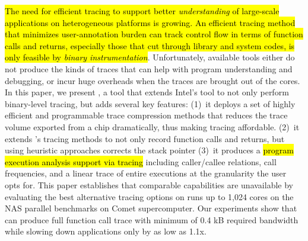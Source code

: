 \hl{The need for efficient tracing to 
support better \textit{understanding} of
large-scale applications on heterogeneous platforms is growing. 
%
An efficient tracing method that minimizes user-annotation burden
can track control flow in terms of function calls and returns, especially
those that cut through library and system codes, 
is only feasible by \textit{binary instrumentation}}.
%
Unfortunately, available tools either do not produce the kinds
of traces that can help with program understanding and debugging,
or incur huge overheads when
the traces are brought out of the cores.
%
In this paper, we present \parlot,  a tool that extends Intel's \pin
tool to not only perform binary-level tracing, but adds several key
features: (1)~it deploys a set of highly efficient and programmable
trace compression methods that reduces the trace volume exported 
from a chip dramatically, thus making tracing affordable.
(2)~it extends \pin's tracing methods to not only record function
calls and returns, but using heuristic approaches corrects the
stack pointer
(3)~it produces a \hl{program execution analysis support via tracing} 
including caller/callee
relations, call frequencies, and a linear trace of entire executions
at the granularity the user opts for.
%
This paper establishes that comparable capabilities are 
unavailable by evaluating the best alternative tracing options
on runs up to 1,024 cores on the NAS parallel benchmarks on 
Comet supercomputer.
%
Our experiments show that \parlot can produce full function 
call trace with minimum of 0.4 kB required bandwidth while 
slowing down applications only by as low as 1.1x. 
%
